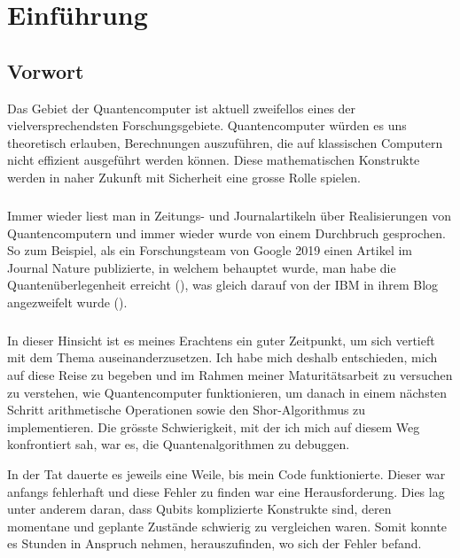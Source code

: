 \chapter{Einführung}
\section{Vorwort}
Das Gebiet der Quantencomputer ist aktuell zweifellos eines der vielversprechendsten Forschungsgebiete. Quantencomputer würden es uns theoretisch erlauben, Berechnungen auszuführen, die auf klassischen Computern nicht effizient ausgeführt werden können. Diese mathematischen Konstrukte werden in naher Zukunft mit Sicherheit eine grosse Rolle spielen. 

\paragraph{}

Immer wieder liest man in Zeitungs- und Journalartikeln über Realisierungen von Quantencomputern und immer wieder wurde von einem Durchbruch gesprochen. So zum Beispiel, als ein Forschungsteam von Google 2019 einen Artikel im Journal \grqq Nature\grqq{} publizierte, in welchem behauptet wurde, man habe die \grqq Quantenüberlegenheit\grqq{} erreicht (\cite{GSP}), was gleich darauf von der IBM in ihrem Blog angezweifelt wurde (\cite{IBM}).

\paragraph{}

In dieser Hinsicht ist es meines Erachtens ein guter Zeitpunkt, um sich vertieft mit dem Thema auseinanderzusetzen. Ich habe mich deshalb entschieden, mich auf diese Reise zu begeben und im Rahmen meiner Maturitätsarbeit zu versuchen zu verstehen, wie Quantencomputer funktionieren, um danach in einem nächsten Schritt arithmetische Operationen sowie den Shor-Algorithmus zu implementieren. Die grösste Schwierigkeit, mit der ich mich auf diesem Weg konfrontiert sah, war es, die Quantenalgorithmen zu debuggen.

In der Tat dauerte es jeweils eine Weile, bis mein Code funktionierte. Dieser war anfangs fehlerhaft und diese Fehler zu finden war eine Herausforderung. Dies lag unter anderem daran, dass Qubits komplizierte Konstrukte sind, deren momentane und geplante Zustände schwierig zu vergleichen waren. Somit konnte es Stunden in Anspruch nehmen, herauszufinden, wo sich der Fehler befand.


